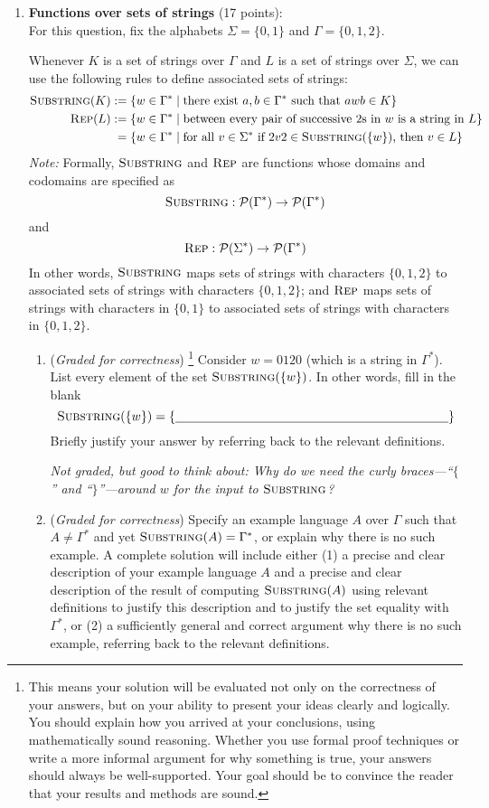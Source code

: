 \documentclass[12pt, oneside]{article}
\newcommand{\gradeCorrect}{({\it Graded for correctness}) }
\newcommand{\gradeCorrectFirst}{\gradeCorrect\footnote{This means your solution 
will be evaluated not only on the correctness of your answers, but on your ability
to present your ideas clearly and logically. You should explain how you 
arrived at your conclusions, using
mathematically sound reasoning. Whether you use formal proof techniques or 
write a more informal argument
for why something is true, your answers should always be well-supported. 
Your goal should be to convince the
reader that your results and methods are sound.} }
\newcommand{\SUBSTRING}{\textsc{Substring}}
\newcommand{\REP}{\textsc{Rep}}
\begin{document}
\begin{enumerate}[wide, labelwidth=!, labelindent=0pt]
    \item \textbf{Functions over sets of strings} (17 points): \\
    For this question, fix the alphabets $\Sigma = \{0,1\}$ and
    $\Gamma = \{0,1,2\}$.

    Whenever $K$ is a set of strings over $\Gamma$ and 
    $L$ is a set of strings over $\Sigma$, 
    we can use the following 
    rules to define associated sets of strings:
    \begin{align*}
    \SUBSTRING(K) &:= \{ w \in \Gamma^* \mid \text{there exist } a,b \in \Gamma^* \text{ such that } awb \in K\} \\
    \REP(L) &:= \{ w \in \Gamma^* \mid \text{between every 
    pair of successive $2$s in $w$ is a string in $L$}\}\\
    &\phantom{:}=\{w \in \Gamma^* \mid \text{for all } v \in \Sigma^* \text{ if } 2v2 \in \SUBSTRING(\{w\})  \text{, then } v \in L\}
    \end{align*}
    \textit{Note:} Formally, $\SUBSTRING$ and $\REP$ are functions
    whose domains and codomains are specified as
    $$\SUBSTRING: \mathcal{P}(\Gamma^*) \to \mathcal{P}(\Gamma^*)$$ 
    and 
    $$\REP: \mathcal{P}(\Sigma^*) \to \mathcal{P}(\Gamma^*)$$
    In other words, $\SUBSTRING$ maps sets of strings with characters $\{0,1,2\}$ to associated
    sets of strings with characters $\{0,1,2\}$; and $\REP$ maps sets of strings with characters 
    in $\{0,1\}$ to associated sets of strings with characters in $\{0,1,2\}$.
    \begin{enumerate}
    \item \gradeCorrectFirst Consider $w = 0120$ (which is a string in $\Gamma^*$). 
    List every element of the set $\SUBSTRING(\{w\})$. 
    In other words, fill in the blank
    \[
    \SUBSTRING(\{w\}) = \{ \underline{\phantom{\hspace{3in}}} \}
    \]
    Briefly justify your answer by referring back to the relevant definitions.

    {\it Not graded, but good to think about: Why do we need the curly braces---``$\{$'' and ``$\}$''---around $w$ for the input to $\SUBSTRING$?}

    \item\gradeCorrect Specify an example language $A$ over $\Gamma$ such that 
    $A \neq \Gamma^*$ and yet $\SUBSTRING(A) = \Gamma^*$, 
    or explain why there is no such example. 
    A complete solution will include either (1) a precise and
    clear description of your example language $A$ 
    and a precise and clear description of
    the result of computing $\SUBSTRING(A)$ using relevant definitions 
    to justify this description and to justify the set equality with 
    $\Gamma^*$, or (2) a sufficiently general and correct argument
    why there is no such example, referring back to the relevant definitions.


\end{enumerate}
\end{enumerate}
\end{document}
